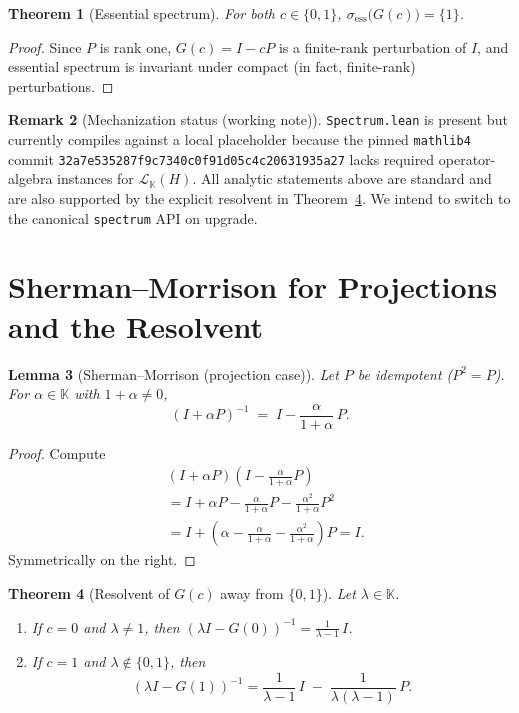 \documentclass[11pt]{article}
\newtheorem{theorem}{Theorem}[section]
\newtheorem{lemma}[theorem]{Lemma}
\theoremstyle{definition}
\newtheorem{remark}[theorem]{Remark}
\newcommand{\K}{\mathbb{K}}
\newcommand{\CL}[2]{\mathcal{L}_{#1}(#2)} %
\begin{document}
\begin{theorem}[Essential spectrum]\label{thm:ess}
For both $c\in\{0,1\}$, $\sigma_{\mathrm{ess}}\big(G(c)\big)=\{1\}$.
\end{theorem}

\begin{proof}
Since $P$ is rank one, $G(c)=I-cP$ is a finite-rank perturbation of $I$, and essential spectrum is invariant under compact (in fact, finite-rank) perturbations.
\end{proof}

\begin{remark}[Mechanization status (working note)]
\texttt{Spectrum.lean} is present but currently compiles against a local placeholder because the pinned \texttt{mathlib4} commit \texttt{32a7e535287f9c7340c0f91d05c4c20631935a27} lacks required operator-algebra instances for $\CL{\K}{H}$. All analytic statements above are standard and are also supported by the explicit resolvent in Theorem~\ref{thm:SM-resolvent}. We intend to switch to the canonical \texttt{spectrum} API on upgrade.
\end{remark}

\section{Sherman--Morrison for Projections and the Resolvent}\label{sec:SM}

\begin{lemma}[Sherman--Morrison (projection case)]\label{lem:SM}
Let $P$ be idempotent ($P^2=P$). For $\alpha\in\K$ with $1+\alpha\neq 0$,
\[
(I+\alpha P)^{-1} \;=\; I - \frac{\alpha}{1+\alpha}\,P.
\]
\end{lemma}

\begin{proof}
Compute
\begin{align}
&(I+\alpha P)\left(I - \frac{\alpha}{1+\alpha}P\right) \\
&= I + \alpha P - \frac{\alpha}{1+\alpha}P - \frac{\alpha^2}{1+\alpha}P^2 \\
&= I + \left(\alpha - \frac{\alpha}{1+\alpha} - \frac{\alpha^2}{1+\alpha}\right)P = I.
\end{align}
Symmetrically on the right.
\end{proof}

\begin{theorem}[Resolvent of $G(c)$ away from $\{0,1\}$]\label{thm:SM-resolvent}
Let $\lambda\in\K$.
\begin{enumerate}
\item If $c=0$ and $\lambda\neq 1$, then $(\lambda I - G(0))^{-1}=\frac{1}{\lambda-1}\,I$.
\item If $c=1$ and $\lambda\notin\{0,1\}$, then
\[
(\lambda I - G(1))^{-1}
= \frac{1}{\lambda-1}\,I \;-\; \frac{1}{\lambda(\lambda-1)}\,P.
\]
\end{enumerate}
\end{theorem}
\end{document}
